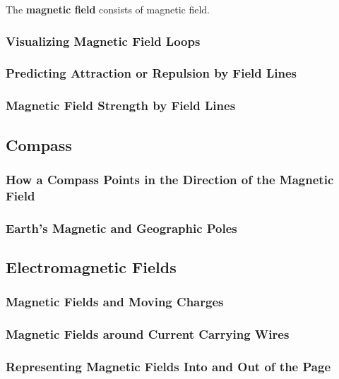 \documentclass[dvipsnames]{article}
\begin{document}
The \textbf{\gls{magnetic field}} consists of \glsdesc{magnetic field}.

\subsubsection{Visualizing Magnetic Field Loops}

\subsubsection{Predicting Attraction or Repulsion by Field Lines}

\subsubsection{Magnetic Field Strength by Field Lines}

\subsection{Compass}

\subsubsection{How a Compass Points in the Direction of the Magnetic Field}

\subsubsection{Earth's Magnetic and Geographic Poles}

\subsection{Electromagnetic Fields}

\subsubsection{Magnetic Fields and Moving Charges}

\subsubsection{Magnetic Fields around Current Carrying Wires}

\subsubsection{Representing Magnetic Fields Into and Out of the Page}
\end{document}

